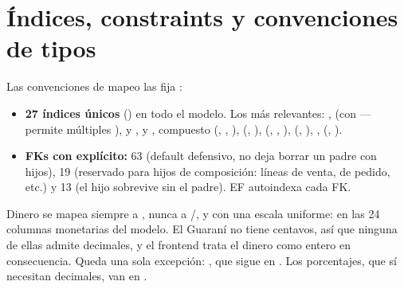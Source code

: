 \section{Índices, constraints y convenciones de tipos}
\label{sec:indices-constraints}

Las convenciones de mapeo las fija \allowbreak {}\allowbreak {}\allowbreak {}:

\begin{itemize}
  \item \textbf{27 índices únicos} (\allowbreak {}\allowbreak {}\allowbreak {}\allowbreak {}) en todo el modelo. Los más relevantes: ,  (con \allowbreak {}\allowbreak {} --- permite múltiples ), \allowbreak {} y \allowbreak {},  y ,  compuesto (, , ),  (, ), \allowbreak {} (, , ),  (, ), ,  (, ).
  \item \textbf{FKs con  explícito:} 63  (default defensivo, no deja borrar un padre con hijos), 19  (reservado para hijos de composición: líneas de venta, de pedido, etc.) y 13  (el hijo sobrevive sin el padre). EF autoindexa cada FK.
\end{itemize}

Dinero se mapea siempre a , nunca a /, y con una escala uniforme:  en las 24 columnas monetarias del modelo. El Guaraní no tiene centavos, así que ninguna de ellas admite decimales, y el frontend trata el dinero como entero en consecuencia. Queda una sola excepción: \allowbreak {}, que sigue en . Los porcentajes, que sí necesitan decimales, van en .

